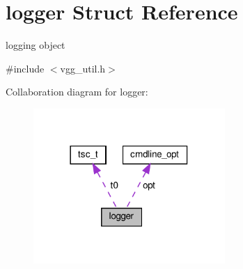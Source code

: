 \hypertarget{structlogger}{}\section{logger Struct Reference}
\label{structlogger}


logging object  




{\ttfamily \#include $<$vgg\+\_\+util.\+h$>$}



Collaboration diagram for logger\+:
\nopagebreak
\begin{figure}[H]
\begin{center}
\leavevmode
\includegraphics[width=206pt]{structlogger__coll__graph}
\end{center}
\end{figure}
